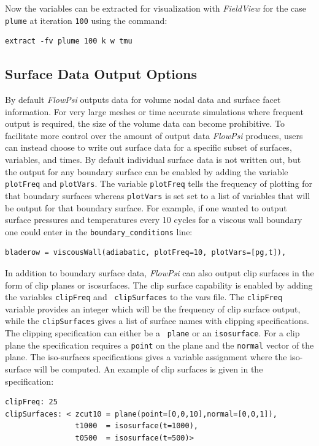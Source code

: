 \documentclass{article}
\begin{document}
Now the variables can be extracted for visualization with {\it FieldView} for the case {\tt plume} at iteration {\tt 100} using the command:
\begin{verbatim}
extract -fv plume 100 k w tmu
\end{verbatim}


\subsection{Surface Data Output Options}

By default {\em FlowPsi} outputs data for volume nodal data and surface facet
information.  For very large meshes or time accurate simulations where
frequent output is required, the size of the volume data can become
prohibitive.  To facilitate more control over the amount of output
data {\em FlowPsi} produces, users can instead choose to write out surface data
for a specific subset of surfaces, variables, and times.  By default
individual surface data is not written out, but the output for any
boundary surface can be enabled by adding the variable {\tt plotFreq}
and {\tt plotVars}.  The variable {\tt plotFreq} tells the frequency
of plotting for that boundary surfaces whereas {\tt plotVars} is set
set to a list of variables that will be output for that boundary
surface.  For example, if one wanted to output surface pressures and
temperatures every 10 cycles for a viscous wall boundary one could
enter in the {\tt boundary\_conditions} line:
\begin{verbatim}
bladerow = viscousWall(adiabatic, plotFreq=10, plotVars=[pg,t]),
\end{verbatim}

In addition to boundary surface data, {\em FlowPsi} can also output clip
surfaces in the form of clip planes or isosurfaces.  The clip surface
capability is enabled by adding the variables {\tt clipFreq} and {\tt
  clipSurfaces} to the vars file.  The {\tt clipFreq} variable provides an
integer which will be the frequency of clip surface output, while the
{\tt clipSurfaces} gives a list of surface names with clipping
specifications.  The clipping specification can either be a {\tt
  plane} or an {\tt isosurface}.  For a clip plane the specification
requires a {\tt point} on the plane and the {\tt normal} vector of the
plane.  The iso-surfaces specifications gives a variable assignment
where the iso-surface will be computed.  An example of clip surfaces
is given in the specification:

\begin{verbatim}
clipFreq: 25
clipSurfaces: < zcut10 = plane(point=[0,0,10],normal=[0,0,1]),
                t1000  = isosurface(t=1000),
                t0500  = isosurface(t=500)>
\end{verbatim}
\end{document}
